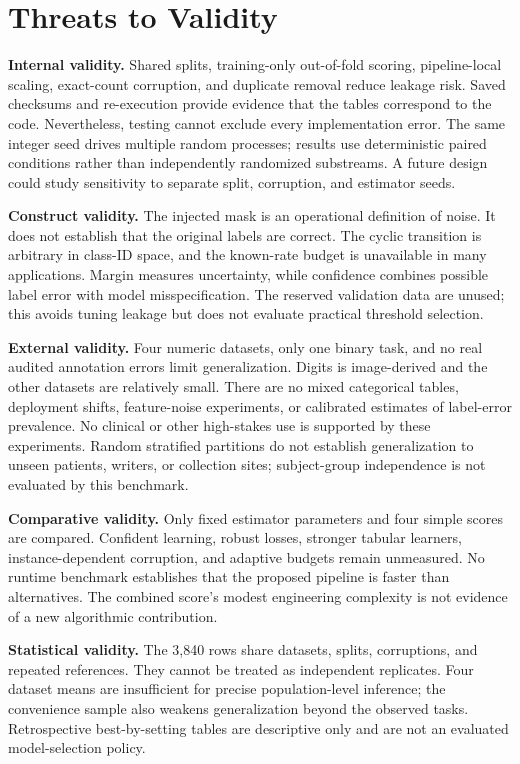 \section{Threats to Validity}
\textbf{Internal validity.} Shared splits, training-only out-of-fold scoring,
pipeline-local scaling, exact-count corruption, and duplicate removal reduce
leakage risk. Saved checksums and re-execution provide evidence that the
tables correspond to the code. Nevertheless, testing cannot exclude every
implementation error. The same integer seed drives multiple random processes;
results use deterministic paired conditions rather than independently
randomized substreams. A future design could study sensitivity to separate
split, corruption, and estimator seeds.

\textbf{Construct validity.} The injected mask is an operational definition
of noise. It does not establish that the original labels are correct. The
cyclic transition is arbitrary in class-ID space, and the known-rate budget
is unavailable in many applications. Margin measures uncertainty, while
confidence combines possible label error with model misspecification.
The reserved validation data are unused; this avoids tuning leakage but
does not evaluate practical threshold selection.

\textbf{External validity.} Four numeric datasets, only one binary task,
and no real audited annotation errors limit generalization. Digits is
image-derived and the other datasets are relatively small. There are no
mixed categorical tables, deployment shifts, feature-noise experiments,
or calibrated estimates of label-error prevalence. No clinical or other
high-stakes use is supported by these experiments.
Random stratified partitions do not establish generalization to unseen
patients, writers, or collection sites; subject-group independence is not
evaluated by this benchmark.

\textbf{Comparative validity.} Only fixed estimator parameters and four
simple scores are compared. Confident learning, robust losses, stronger
tabular learners, instance-dependent corruption, and adaptive budgets remain
unmeasured. No runtime benchmark establishes that the proposed pipeline is
faster than alternatives. The combined score's modest engineering complexity
is not evidence of a new algorithmic contribution.

\textbf{Statistical validity.} The 3,840 rows share datasets, splits,
corruptions, and repeated references. They cannot be treated as independent
replicates. Four dataset means are insufficient for precise population-level
inference; the convenience sample also weakens generalization beyond the
observed tasks. Retrospective best-by-setting tables are descriptive only
and are not an evaluated model-selection policy.
